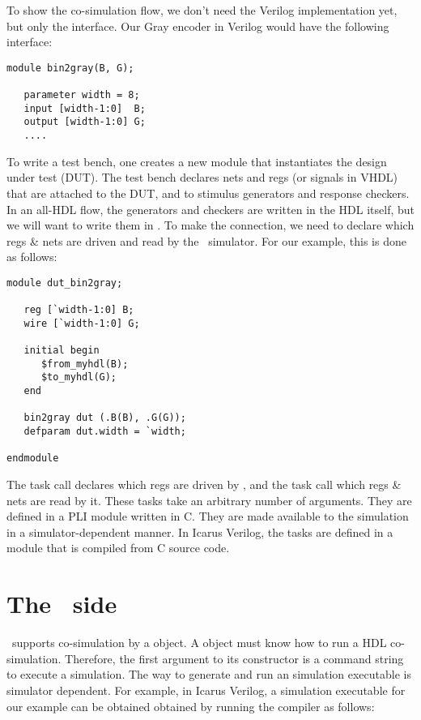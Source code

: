 To show the co-simulation flow, we don't need the Verilog
implementation yet, but only the interface.  Our Gray encoder in
Verilog would have the following interface:

\begin{verbatim}
module bin2gray(B, G);

   parameter width = 8;
   input [width-1:0]  B;     
   output [width-1:0] G;
   ....

\end{verbatim}

To write a test bench, one creates a new module that instantiates the
design under test (DUT).  The test bench declares nets and
regs (or signals in VHDL) that are attached to the DUT, and to
stimulus generators and response checkers. In an all-HDL flow, the
generators and checkers are written in the HDL itself, but we will
want to write them in \myhdl{}. To make the connection, we need to
declare which regs \& nets are driven and read by the \myhdl\
simulator. For our example, this is done as follows:

\begin{verbatim}
module dut_bin2gray;

   reg [`width-1:0] B;
   wire [`width-1:0] G;

   initial begin
      $from_myhdl(B);
      $to_myhdl(G);
   end

   bin2gray dut (.B(B), .G(G));
   defparam dut.width = `width;

endmodule

\end{verbatim}

The  task call declares which regs are driven by
\myhdl{}, and the \code{\$to_myhdl} task call which regs \& nets are read
by it. These tasks take an arbitrary number of arguments.  They
are defined in a PLI module written in C. They are made available to
the simulation in a simulator-dependent manner.  In Icarus Verilog,
the tasks are defined in a \code{myhdl.vpi} module that is compiled
from C source code.

\section{The \myhdl\ side}

\myhdl\ supports co-simulation by a  object. 
A \code{Co-Simulation} object must know how to run a HDL co-simulation.
Therefore, the first argument to its constructor is a command string
to execute a simulation. The way to generate and run an
simulation executable is simulator dependent.
For example, in Icarus Verilog, a simulation executable for our
example can be obtained obtained by running the 
compiler as follows:

